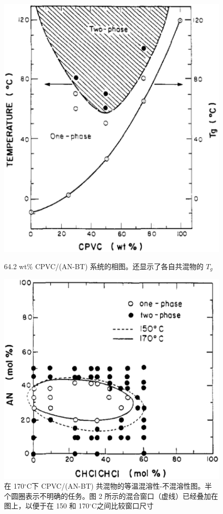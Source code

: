 \documentclass[a4paper,transmag,12pt]{IEEEtran}    %
\newcommand{\cdegree}{$^{\circ}$C}  %
\begin{document}
\begin{figure}[htb]
    \centering
    \includegraphics[width=.9\linewidth]{src/figure5.eps}
    \caption{64.2 wt\% CPVC/(AN-BT) 系统的相图。还显示了各自共混物的 $T_g$}
    \centering
    \includegraphics[width=.9\linewidth]{src/figure6.eps}
    \caption{在 170\cdegree 下 CPVC/(AN-BT) 共混物的等温混溶性-不混溶性图。半个圆圈表示不明确的任务。图 2 所示的混合窗口（虚线）已经叠加在图上，以便于在 150 和 170\cdegree 之间比较窗口尺寸}
\end{figure}
\end{document}
